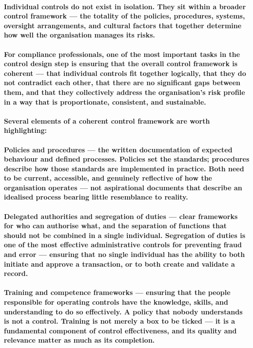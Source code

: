 \paragraph{Individual controls do not exist in isolation. They sit within a broader \textbf{control framework} — the totality of the policies, procedures, systems, oversight arrangements, and cultural factors that together determine how well the organisation manages its risks.}
\paragraph{For compliance professionals, one of the most important tasks in the control design step is ensuring that the overall control framework is \textbf{coherent} — that individual controls fit together logically, that they do not contradict each other, that there are no significant gaps between them, and that they collectively address the organisation's risk profile in a way that is proportionate, consistent, and sustainable.}
\paragraph{Several elements of a coherent control framework are worth highlighting:}
\paragraph{\textbf{Policies and procedures} — the written documentation of expected behaviour and defined processes. Policies set the standards; procedures describe how those standards are implemented in practice. Both need to be current, accessible, and genuinely reflective of how the organisation operates — not aspirational documents that describe an idealised process bearing little resemblance to reality.}
\paragraph{\textbf{Delegated authorities and segregation of duties} — clear frameworks for who can authorise what, and the separation of functions that should not be combined in a single individual. Segregation of duties is one of the most effective administrative controls for preventing fraud and error — ensuring that no single individual has the ability to both initiate and approve a transaction, or to both create and validate a record.}
\paragraph{\textbf{Training and competence frameworks} — ensuring that the people responsible for operating controls have the knowledge, skills, and understanding to do so effectively. A policy that nobody understands is not a control. Training is not merely a box to be ticked — it is a fundamental component of control effectiveness, and its quality and relevance matter as much as its completion.}
